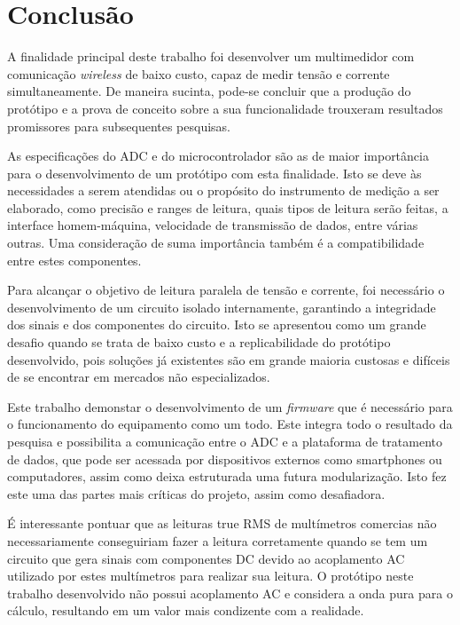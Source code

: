 \chapter{Conclusão}\label{cap:conclusoeseperspectivas}

A finalidade principal deste trabalho foi desenvolver um multimedidor com comunicação \textit{wireless} de baixo custo, capaz de medir tensão e corrente simultaneamente. De maneira sucinta, pode-se concluir que a produção do protótipo e a prova de conceito sobre a sua funcionalidade trouxeram resultados promissores para subsequentes pesquisas.

As especificações do \gls{ADC} e do microcontrolador são as de maior importância para o desenvolvimento de um protótipo com esta finalidade. Isto se deve às necessidades a serem atendidas ou o propósito do instrumento de medição a ser elaborado, como precisão e ranges de leitura, quais tipos de leitura serão feitas, a interface homem-máquina, velocidade de transmissão de dados, entre várias outras. Uma consideração de suma importância também é a compatibilidade entre estes componentes.

Para alcançar o objetivo de leitura paralela de tensão e corrente, foi necessário o desenvolvimento de um circuito isolado internamente, garantindo a integridade dos sinais e dos componentes do circuito. Isto se apresentou como um grande desafio quando se trata de baixo custo e a replicabilidade do protótipo desenvolvido, pois soluções já existentes são em grande maioria custosas e difíceis de se encontrar em mercados não especializados.

Este trabalho demonstar o desenvolvimento de um \textit{firmware} que é necessário para o funcionamento do equipamento como um todo. Este integra todo o resultado da pesquisa e possibilita a comunicação entre o ADC e a plataforma de tratamento de dados, que pode ser acessada por dispositivos externos como smartphones ou computadores, assim como deixa estruturada uma futura modularização. Isto fez este uma das partes mais críticas do projeto, assim como desafiadora.

É interessante pontuar que as leituras true RMS de multímetros comercias não necessariamente conseguiriam fazer a leitura corretamente quando se tem um circuito que gera sinais com componentes DC devido ao acoplamento AC utilizado por estes multímetros para realizar sua leitura. O protótipo neste trabalho desenvolvido não possui acoplamento AC e considera a onda pura para o cálculo, resultando em um valor mais condizente com a realidade.

